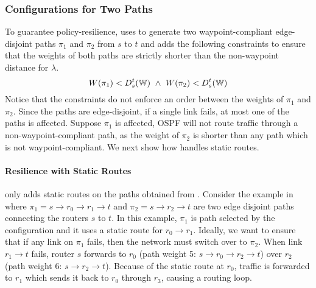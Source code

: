 \subsubsection{Configurations for Two Paths} \label{sec:ospfresilience}
To guarantee policy-resilience, \name
uses \genesis to generate two waypoint-compliant 
edge-disjoint paths $\pi_1$ and $\pi_2$ from $s$ to $t$
and
adds the following constraints
 to ensure that the  weights 
of both paths are strictly shorter than 
the non-waypoint distance for $\lambda$. 
\begin{equation} \label{eq:resilience}
W(\pi_1) < D^t_s(\mathbb{W}) ~\wedge~ W(\pi_2) < D^t_s(\mathbb{W}) 
\end{equation}
Notice that the constraints do not enforce an order between the weights of $\pi_1$ and $\pi_2$.
Since the paths are edge-disjoint, if a single link fails, at most one 
of the paths is affected. Suppose
$\pi_1$ is affected, OSPF will not route traffic through a  
non-waypoint-compliant path, as the weight of $\pi_2$ is shorter than any path which is not waypoint-compliant.
We next show how \name handles static routes.

\paragraph{Resilience with Static Routes}
\name only adds static routes on the paths obtained from \genesis.
Consider the example in  where 
$\pi_1=s\rightarrow r_0 \rightarrow r_1 \rightarrow t$ 
and $\pi_2=s\rightarrow r_2 \rightarrow t$ 
are two edge disjoint paths 
connecting the routers $s$ to $t$. In this example, 
$\pi_1$ is path selected by the configuration and it uses a static route
for $r_0 \rightarrow r_1$. 
Ideally, we want to ensure 
that if any link on $\pi_1$ fails, 
then the network must switch over to $\pi_2$. 
When link $r_1 \rightarrow t$ fails,
router $s$ forwards to $r_0$ (path weight 5: $ s \rightarrow r_0 \rightarrow r_2 \rightarrow t$)
over $r_2$ (path weight 6: $s \rightarrow r_2 \rightarrow t$). 
Because of the static route at $r_0$, traffic is forwarded
to $r_1$ which sends it back to $r_0$ through $r_3$, 
causing a routing loop. 






